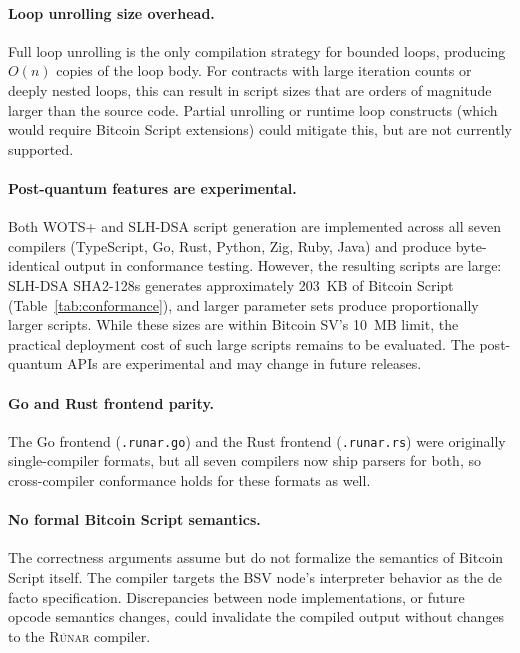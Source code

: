 \documentclass[11pt,a4paper]{article}
\newcommand{\runar}{\textsc{Rúnar}}
\begin{document}
\paragraph{Loop unrolling size overhead.}
Full loop unrolling is the only compilation strategy for bounded loops,
producing $O(n)$ copies of the loop body. For contracts with large
iteration counts or deeply nested loops, this can result in script sizes
that are orders of magnitude larger than the source code. Partial
unrolling or runtime loop constructs (which would require Bitcoin Script
extensions) could mitigate this, but are not currently supported.

\paragraph{Post-quantum features are experimental.}
Both WOTS+ and SLH-DSA script generation are implemented across all seven
compilers (TypeScript, Go, Rust, Python, Zig, Ruby, Java) and produce byte-identical output in
conformance testing. However, the resulting scripts are large:
SLH-DSA SHA2-128s generates approximately 203~KB of Bitcoin Script
(Table~\ref{tab:conformance}), and larger parameter sets produce
proportionally larger scripts. While these sizes are within Bitcoin SV's
10~MB limit, the practical deployment cost of such large scripts remains
to be evaluated. The post-quantum APIs are experimental and may change in
future releases.

\paragraph{Go and Rust frontend parity.}
The Go frontend (\texttt{.runar.go}) and the Rust frontend (\texttt{.runar.rs})
were originally single-compiler formats, but all seven compilers now ship
parsers for both, so cross-compiler conformance holds for these formats as
well.

\paragraph{No formal Bitcoin Script semantics.}
The correctness arguments assume but do not formalize the semantics of
Bitcoin Script itself. The compiler targets the BSV node's interpreter
behavior as the de facto specification. Discrepancies between node
implementations, or future opcode semantics changes, could invalidate
the compiled output without changes to the \runar{} compiler.

\end{document}
